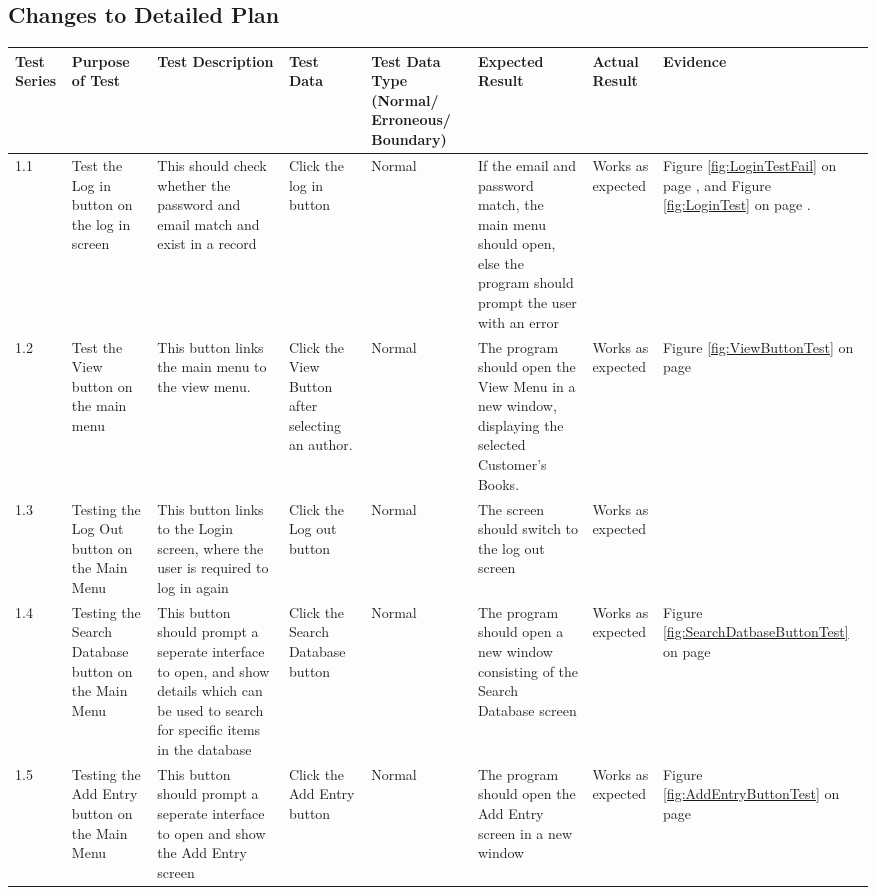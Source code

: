 \begin{landscape}
\subsection{Changes to Detailed Plan}


\begin{center}
    \begin{longtable}{|p{1.5cm}|p{2cm}|p{2.5cm}|p{2.5cm}|p{2cm}|p{2cm}|p{2cm}|p{2cm}|}
        \hline
        \textbf{Test Series} & \textbf{Purpose of Test} & \textbf{Test Description} & \textbf{Test Data} & \textbf{Test Data Type (Normal/ Erroneous/ Boundary)} & \textbf{Expected Result} & \textbf{Actual Result} & \textbf{Evidence}\\ \hline
        1.1 & Test the Log in button on the log in screen & This should check whether the password and email match and exist in a record & Click the log in button & Normal & If the email and password match, the main menu should open, else the program should prompt the user with an error & Works as expected & Figure \ref{fig:LoginTestFail} on page \pageref{fig:LoginTestFail}, and Figure \ref{fig:LoginTest} on page \pageref{fig:LoginTest}. \\ \hline
        1.2 & Test the View button on the main menu & This button links the main menu to the view menu. & Click the View Button after selecting an author. & Normal & The program should open the View Menu in a new window, displaying the selected Customer's Books. & Works as expected & Figure \ref{fig:ViewButtonTest} on page \pageref{fig:ViewButtonTest} \\ \hline
        1.3 & Testing the Log Out button on the Main Menu & This button links to the Login screen, where the user is required to log in again & Click the Log out button & Normal & The screen should switch to the log out screen & Works as expected & \\ \hline
        1.4 & Testing the Search Database button on the Main Menu & This button should prompt a seperate interface to open, and show details which can be used to search for specific items in the database & Click the Search Database button & Normal & The program should open a new window consisting of the Search Database screen & Works as expected & Figure \ref{fig:SearchDatbaseButtonTest} on page \pageref{fig:SearchDatbaseButtonTest} \\ \hline
        1.5 & Testing the Add Entry button on the Main Menu & This button should prompt a seperate interface to open and show the Add Entry screen & Click the Add Entry button & Normal & The program should open the Add Entry screen in a new window & Works as expected & Figure \ref{fig:AddEntryButtonTest} on page \pageref{fig:AddEntryButtonTest} \\ \hline

\end{longtable}
\end{center}
\end{landscape}
